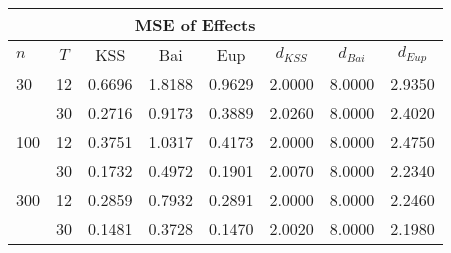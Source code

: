 \begin{tabular}{lccccccc} 
\hline \multicolumn{7}{c}{MSE of Effects} \\ \hline 
$n$ & $T$ & KSS & Bai & Eup & $d_{KSS}$ & $d_{Bai}$ & $d_{Eup}$ \\
\hline
30 & 12 &  0.6696  &  1.8188  &  0.9629  &  2.0000  &  8.0000  &  2.9350  \\
& 30 &  0.2716  &  0.9173  &  0.3889  &  2.0260  &  8.0000  &  2.4020  \\
100 & 12 &  0.3751  &  1.0317  &  0.4173  &  2.0000  &  8.0000  &  2.4750  \\
& 30 &  0.1732  &  0.4972  &  0.1901  &  2.0070  &  8.0000  &  2.2340  \\
300 & 12 &  0.2859  &  0.7932  &  0.2891  &  2.0000  &  8.0000  &  2.2460  \\
& 30 &  0.1481  &  0.3728  &  0.1470  &  2.0020  &  8.0000  &  2.1980  \\
\end{tabular} 
